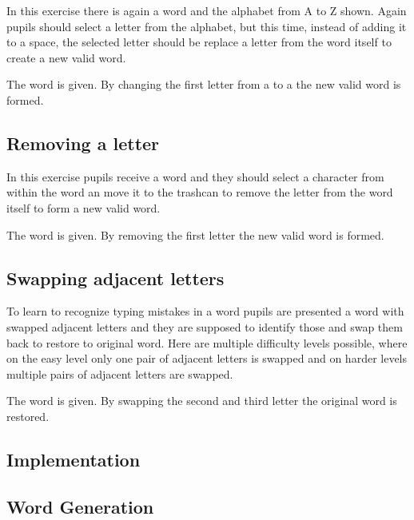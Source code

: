 In this exercise there is again a word and the alphabet from A to Z shown. Again pupils should select a letter from the alphabet, but this time, instead of adding it to a space, the selected letter should be replace a letter from the word itself to create a new valid word.

\begin{example}
    The word  is given. By changing the first letter from a  to a  the new valid word  is formed.
\end{example}

\subsection*{Removing a letter}

In this exercise pupils receive a word and they should select a character from within the word an move it to the trashcan to remove the letter from the word itself to form a new valid word.

\begin{example}
    The word  is given. By removing the first letter the new valid word  is formed.
\end{example}

\subsection*{Swapping adjacent letters}

To learn to recognize typing mistakes in a word pupils are presented a word with swapped adjacent letters and they are supposed to identify those and swap them back to restore to original word. Here are multiple difficulty levels possible, where on the easy level only one pair of adjacent letters is swapped and on harder levels multiple pairs of adjacent letters are swapped.

\begin{example}
    The word  is given. By swapping the second and third letter the original word  is restored.
\end{example}

\subsection{Implementation}

\subsection*{Word Generation}

